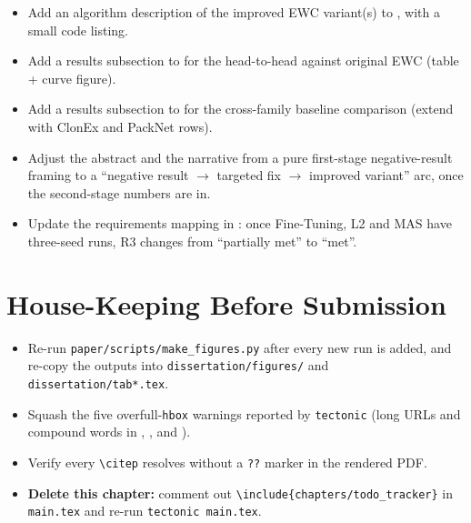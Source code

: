 \begin{itemize}
    \item Add an algorithm description of the improved EWC
        variant(s) to , with a small code listing.
    \item Add a results subsection to  for the
        head-to-head against original EWC (table + curve figure).
    \item Add a results subsection to  for the
        cross-family baseline comparison (extend
         with ClonEx and PackNet rows).
    \item Adjust the abstract and the  narrative
        from a pure first-stage negative-result framing to a
        ``negative result $\rightarrow$ targeted fix $\rightarrow$
        improved variant'' arc, once the second-stage numbers are
        in.
    \item Update the requirements mapping in
        : once Fine-Tuning, L2 and MAS have
        three-seed runs, R3 changes from ``partially met'' to
        ``met''.
\end{itemize}

\section*{House-Keeping Before Submission}

\begin{itemize}
    \item Re-run \texttt{paper/scripts/make\_figures.py} after
        every new run is added, and re-copy the outputs into
        \texttt{dissertation/figures/} and
        \texttt{dissertation/tab*.tex}.
    \item Squash the five overfull-\texttt{hbox} warnings reported
        by \texttt{tectonic} (long URLs and compound words in
        , ,
         and ).
    \item Verify every \texttt{\textbackslash citep} resolves
        without a \texttt{??}{} marker in the rendered PDF.
    \item \textbf{Delete this chapter:} comment out
        \texttt{\textbackslash include\{chapters/todo\_tracker\}}
        in \texttt{main.tex} and re-run \texttt{tectonic main.tex}.
\end{itemize}
